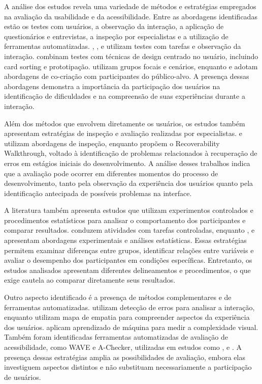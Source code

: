 A análise dos estudos revela uma variedade de métodos e estratégias empregados na avaliação da usabilidade e da acessibilidade. Entre as abordagens identificadas estão os testes com usuários, a observação da interação, a aplicação de questionários e entrevistas, a inspeção por especialistas e a utilização de ferramentas automatizadas. \cite{gatsou2017seniors}, \cite{xie2010usability}, \cite{allah2021empathy} e \cite{mastarone2007access} utilizam testes com tarefas e observação da interação. \cite{balakrishnan2012user} combinam testes com técnicas de design centrado no usuário, incluindo card sorting e prototipação. \cite{kymäläinen2012creating} utilizam grupos focais e cenários, enquanto \cite{ro2024usability} e \cite{breaking_barriers} adotam abordagens de co-criação com participantes do público-alvo. A presença dessas abordagens demonstra a importância da participação dos usuários na identificação de dificuldades e na compreensão de suas experiências durante a interação.

Além dos métodos que envolvem diretamente os usuários, os estudos também apresentam estratégias de inspeção e avaliação realizadas por especialistas. \cite{kurniawan2005research} e \cite{dombrovskaia2021guideline} utilizam abordagens de inspeção, enquanto \cite{filgueiras2009recoverability} propõem o Recoverability Walkthrough, voltado à identificação de problemas relacionados à recuperação de erros em estágios iniciais do desenvolvimento. A análise desses trabalhos indica que a avaliação pode ocorrer em diferentes momentos do processo de desenvolvimento, tanto pela observação da experiência dos usuários quanto pela identificação antecipada de possíveis problemas na interface.

A literatura também apresenta estudos que utilizam experimentos controlados e procedimentos estatísticos para analisar o comportamento dos participantes e comparar resultados. \cite{sharit2008information} conduzem atividades com tarefas controladas, enquanto \cite{zaphiris2003age}, \cite{ko2019old} e \cite{artis2006effects} apresentam abordagens experimentais e análises estatísticas. Essas estratégias permitem examinar diferenças entre grupos, identificar relações entre variáveis e avaliar o desempenho dos participantes em condições específicas. Entretanto, os estudos analisados apresentam diferentes delineamentos e procedimentos, o que exige cautela ao comparar diretamente seus resultados.

Outro aspecto identificado é a presença de métodos complementares e de ferramentas automatizadas. \cite{taylor2009using} utilizam detecção de erros para analisar a interação, enquanto \cite{allah2021empathy} utilizam mapa de empatia para compreender aspectos da experiência dos usuários. \cite{sadeghi2020hci} aplicam aprendizado de máquina para medir a complexidade visual. Também foram identificadas ferramentas automatizadas de avaliação de acessibilidade, como WAVE e A-Checker, utilizadas em estudos como \cite{kouroupetroglou2016methodological}, \cite{chiriboga2025accessible} e \cite{mowar2025codea11y}. A presença dessas estratégias amplia as possibilidades de avaliação, embora elas investiguem aspectos distintos e não substituam necessariamente a participação de usuários.

